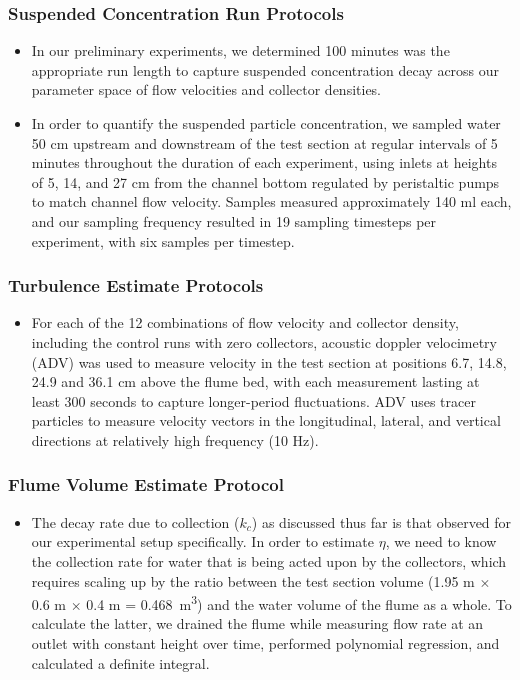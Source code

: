 \documentclass{article}
\begin{document}
\subsubsection{Suspended Concentration Run Protocols}

\begin{itemize}
    \item In our preliminary experiments, we determined 100 minutes was the appropriate run length to capture suspended concentration decay across our parameter space of flow velocities and collector densities.
    \item In order to quantify the suspended particle concentration, we sampled water 50 cm upstream and downstream of the test section at regular intervals of 5 minutes throughout the duration of each experiment, using inlets at heights of 5, 14, and 27 cm from the channel bottom regulated by peristaltic pumps to match channel flow velocity. Samples measured approximately 140 ml each, and our sampling frequency resulted in 19 sampling timesteps per experiment, with six samples per timestep.
\end{itemize}

\subsubsection{Turbulence Estimate Protocols}

\begin{itemize}
    \item For each of the 12 combinations of flow velocity and collector density, including the control runs with zero collectors, acoustic doppler velocimetry (ADV) was used to measure velocity in the test section at positions 6.7, 14.8, 24.9 and 36.1 cm above the flume bed, with each measurement lasting at least 300 seconds to capture longer-period fluctuations. ADV uses tracer particles to measure velocity vectors in the longitudinal, lateral, and vertical directions at relatively high frequency (10 Hz).
\end{itemize}

\subsubsection{Flume Volume Estimate Protocol}

\begin{itemize}
    \item The decay rate due to collection ($k_c$) as discussed thus far is that observed for our experimental setup specifically. In order to estimate $\eta$, we need to know the collection rate for water that is being acted upon by the collectors, which requires scaling up by the ratio between the test section volume (1.95 m $\times$ 0.6 m $\times$ 0.4 m = \SI{0.468}{m^3}) and the water volume of the flume as a whole. To calculate the latter, we drained the flume while measuring flow rate at an outlet with constant height over time, performed polynomial regression, and calculated a definite integral. 
\end{itemize}
\end{document}
